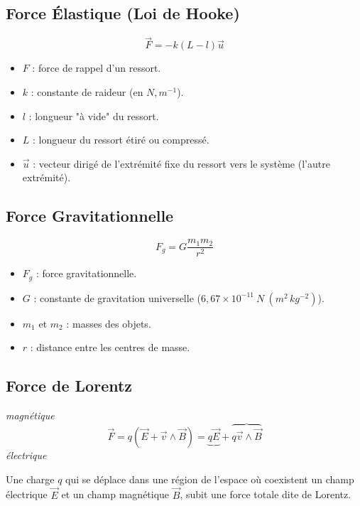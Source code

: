 \documentclass[a4paper,12pt]{article}
\renewcommand{\vec}{\overrightarrow}  %
\begin{document}
        \subsection{Force Élastique (Loi de Hooke)}
                $$ \vec{F} = -k (L- l) \vec{u} $$
            \begin{itemize}[label=$\bullet$]
                \item $F$ : force de rappel d'un ressort.
                \item $k$ : constante de raideur (en $N , m^{-1}$).
                \item $l$ : longueur "à vide" du ressort.
                \item $L$ : longueur du ressort étiré ou compressé.
                \item $\vec{u}$ : vecteur dirigé de l'extrémité fixe du ressort vers le système (l'autre extrémité).
            \end{itemize}
            
        \subsection{Force Gravitationnelle}
                $$ F_g = G \frac{m_1 m_2}{r^2} $$
            \begin{itemize}[label=$\bullet$]
                \item $F_g$ : force gravitationnelle.
                \item $G$ : constante de gravitation universelle ($6,67 \times 10^{-11} \ N \ (m^2 \, kg^{-2})$).
                \item $m_1$ et $m_2$ : masses des objets.
                \item $r$ : distance entre les centres de masse.
            \end{itemize}

        \subsection{Force de Lorentz}
            \hspace{10cm} \textit{magnétique}
            $$ \vec{F} = q(\vec{E} + \vec{v} \wedge \vec{B}) = \underbrace{q\vec{E}} + \overbrace{q \vec{v} \wedge \vec{B}} $$
            \hspace{9.3cm} \textit{électrique}

            Une charge $q$ qui se déplace dans une région de l'espace où coexistent 
            un champ électrique $\vec{E}$ et un champ magnétique $\vec{B}$, subit une force 
            totale dite de Lorentz.
\end{document}
